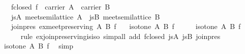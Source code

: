 \begin{isabellebody}
\ \ \ f{}closed{}\ {}f\ {}\ carrier\ A\ {}\ carrier\ B{}\isanewline
\ \ \ js{}A{}\ {}meet{}semilattice\ A{}\ \ js{}B{}\ {}meet{}semilattice\ B{}\isanewline
\ \ \ join{}pres{}\ {}ex{}meet{}preserving\ A\ B\ f{}\isanewline
\ \ \ {}isotone\ A\ B\ f{}\isanewline
%
\isadelimproof
%
\endisadelimproof
%
\isatagproof
{}\isamarkupfalse%
\ {}\isanewline
\ \ \isamarkupfalse%
\ {}isotone\ {}A{}{}\ {}B{}{}\ f{}\isanewline
\ \ \ \ \isamarkupfalse%
\ {}rule\ ex{}join{}preserving{}is{}iso{}\ simp{}all\ add{}\ f{}closed\ js{}A\ js{}B\ join{}pres{}\isanewline
\ \ \isamarkupfalse%
\ {}isotone\ A\ B\ f{}\ \isamarkupfalse%
\ simp\isanewline
{}\isamarkupfalse%
%
\endisatagproof

\end{isabellebody}
